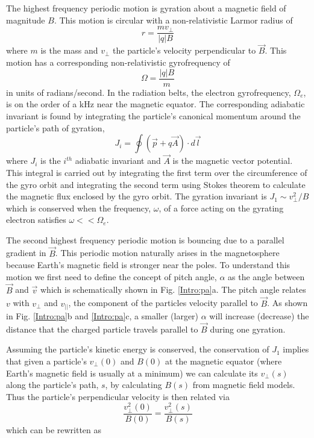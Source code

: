 The highest frequency periodic motion is gyration about a magnetic field of magnitude $B$. This motion is circular with a non-relativistic Larmor radius of 
\begin{equation}
r = \frac{m v_\perp}{|q| B}
\end{equation} where $m$ is the mass and $v_\perp$ the particle's velocity perpendicular to $\vec{B}$. This motion has a corresponding non-relativistic gyrofrequency of
\begin{equation}
\Omega = \frac{|q| B}{m}
\end{equation} in units of radians/second. In the radiation belts, the electron gyrofrequency, $\Omega_e$, is on the order of a kHz near the magnetic equator. The corresponding adiabatic invariant is found by integrating the particle's canonical momentum around the particle's path of gyration,
\begin{equation} \label{J}
J_i = \oint (\vec{p} + q \vec{A}) \cdot d\vec{l}
\end{equation} where $J_i$ is the $i^{th}$ adiabatic invariant and $\vec{A}$ is the magnetic vector potential. This integral is carried out by integrating the first term over the circumference of the gyro orbit and integrating the second term using Stokes theorem to calculate the magnetic flux enclosed by the gyro orbit.  The gyration invariant is $J_1 \sim v_\perp^2 / B$ which is conserved when the frequency, $\omega$, of a force acting on the gyrating electron satisfies $\omega << \Omega_e$.

The second highest frequency periodic motion is bouncing due to a parallel gradient in $\vec{B}$. This periodic motion naturally arises in the magnetosphere because Earth's magnetic field is stronger near the poles. To understand this motion we first need to define the concept of pitch angle, $\alpha$ as the angle between $\vec{B}$ and $\vec{v}$ which is schematically shown in Fig. \ref{Intro:pa}a. The pitch angle relates $v$ with $v_\perp$ and $v_{||}$, the component of the particles velocity parallel to $\vec{B}$. As shown in Fig. \ref{Intro:pa}b and \ref{Intro:pa}c, a smaller (larger) $\alpha$ will increase (decrease) the distance that the charged particle travels parallel to $\vec{B}$ during one gyration.

Assuming the particle's kinetic energy is conserved, the conservation of $J_1$ implies that given a particle's $v_\perp(0)$ and $B(0)$ at the magnetic equator (where Earth's magnetic field is usually at a minimum) we can calculate its $v_\perp(s)$ along the particle's path, $s$, by calculating $B(s)$ from magnetic field models. Thus the particle's perpendicular velocity is then related via
\begin{equation} \label{j1_conservation}
\frac{v_\perp^2 (0)}{B(0)} = \frac{v_\perp^2 (s)}{B(s)}
\end{equation} which can be rewritten as 

